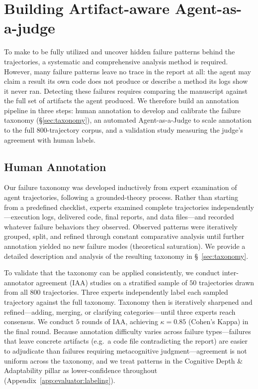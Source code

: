 
\section{Building Artifact-aware Agent-as-a-judge}
\label{sec:judge}

To make \bench to be fully utilized and uncover hidden failure patterns behind the trajectories, a systematic and comprehensive analysis method is required. However, many failure patterns leave no
trace in the report at all: the agent may claim a result its own code does
not produce or describe a method its logs show it never ran. Detecting these failures
requires comparing the manuscript against the full set of artifacts the agent
produced. We
therefore build an annotation pipeline in three steps: human annotation to
develop and calibrate the failure taxonomy (\S\ref{sec:taxonomy}), an
automated Agent-as-a-Judge to scale annotation to the full 800-trajectory
corpus, and a validation study measuring the judge's agreement with human
labels.

\subsection{Human Annotation}
\label{sec:judge:human}

Our failure taxonomy was developed inductively from expert examination of
agent trajectories, following a grounded-theory process\citep{glaser1967discovery}. Rather than
starting from a predefined checklist, experts examined complete
trajectories independently---execution logs, delivered code, final reports, and data files---and recorded whatever failure behaviors they observed. Observed
patterns were iteratively grouped, split, and refined through constant
comparative analysis until further annotation yielded no new failure modes
(theoretical saturation). We provide a detailed description and analysis of
the resulting taxonomy in \S~\ref{sec:taxonomy}.

To validate that the taxonomy can be applied consistently, we conduct
inter-annotator agreement (IAA) studies on a stratified sample of
$50$ trajectories drawn from all $800$ trajectories.
Three experts independently label each sampled trajectory against
the full taxonomy. Taxonomy then is iteratively sharpened and refined---adding, merging, or
clarifying categories---until three experts reach consensus. We conduct $5$
rounds of IAA, achieving $\kappa = 0.85$ (Cohen's Kappa) in the final
round. Because annotation difficulty varies across failure types---failures
that leave concrete artifacts (e.g.\ a code file contradicting the report)
are easier to adjudicate than failures requiring metacognitive
judgment---agreement is not uniform across the taxonomy, and we treat
patterns in the Cognitive Depth \& Adaptability pillar as lower-confidence
throughout (Appendix~\ref{app:evaluator:labeling}).

